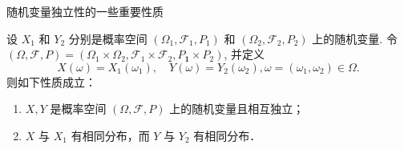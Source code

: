 \documentclass[Prob-All.tex]{subfiles}
\begin{document}
\begin{frame}{随机变量独立性的一些重要性质}
\begin{thm}
设 $X_{1}$ 和 $Y_{2}$ 分别是概率空间 $\left(\Omega_{1}, \mathcal{F}_{1}, P_{1}\right)$ 和 $\left(\Omega_{2}, \mathcal{F}_{2}, P_{2}\right)$ 上的随机变量. 令 $(\Omega, \mathcal{F}, P)=\left(\Omega_{1} \times \Omega_{2}, \mathcal{F}_{1} \times \mathcal{F}_{2}, P_{\mathbf{1}} \times P_{2}\right)$, 并定义
\[
X(\omega)=X_{1}\left(\omega_{1}\right), \quad Y(\omega)=Y_{2}\left(\omega_{2}\right),  \omega=\left(\omega_{1}, \omega_{2}\right) \in \Omega .
\]
则如下性质成立：
\begin{enumerate}[<+-|alert@+>]
\item $X, Y$ 是概率空间 $(\Omega, \mathcal{F}, P)$ 上的随机变量且相互独立；
\item $X$ 与 $X_{1}$ 有相同分布，而 $Y$ 与 $Y_{2}$ 有相同分布．
\end{enumerate}
\end{thm}







\end{frame}
\end{document}
